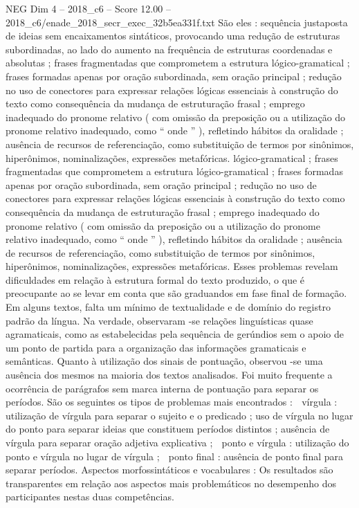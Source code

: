 \begin{textsample}{NEG Dim 4 – 2018\_c6 – Score 12.00 – 2018\_c6/enade\_2018\_secr\_exec\_32b5ea331f.txt}
São eles : sequência justaposta de ideias sem encaixamentos sintáticos, provocando uma redução de estruturas subordinadas, ao lado do aumento na frequência de estruturas coordenadas e absolutas ; frases fragmentadas que comprometem a estrutura lógico-gramatical ; frases formadas apenas por oração subordinada, sem oração principal ; redução no uso de conectores para expressar relações lógicas essenciais à construção do texto como consequência da mudança de estruturação frasal ; emprego inadequado do pronome relativo ( com omissão da preposição ou a utilização do pronome relativo inadequado, como “ onde ” ), refletindo hábitos da oralidade ; ausência de recursos de referenciação, como substituição de termos por sinônimos, hiperônimos, nominalizações, expressões metafóricas. lógico-gramatical ; frases fragmentadas que comprometem a estrutura lógico-gramatical ; frases formadas apenas por oração subordinada, sem oração principal ; redução no uso de conectores para expressar relações lógicas essenciais à construção do texto como consequência da mudança de estruturação frasal ; emprego inadequado do pronome relativo ( com omissão da preposição ou a utilização do pronome relativo inadequado, como “ onde ” ), refletindo hábitos da oralidade ; ausência de recursos de referenciação, como substituição de termos por sinônimos, hiperônimos, nominalizações, expressões metafóricas.
Esses problemas revelam dificuldades em relação à estrutura formal do texto produzido, o que é preocupante ao se levar em conta que são graduandos em fase final de formação.
Em alguns textos, falta um mínimo de textualidade e de domínio do registro padrão da língua.
Na verdade, observaram -se relações linguísticas quase agramaticais, como as estabelecidas pela sequência de gerúndios sem o apoio de um ponto de partida para a organização das informações gramaticais e semânticas.
Quanto à utilização dos sinais de pontuação, observou -se uma ausência dos mesmos na maioria dos textos analisados.
Foi muito frequente a ocorrência de parágrafos sem marca interna de pontuação para separar os períodos.
São os seguintes os tipos de problemas mais encontrados :  vírgula : utilização de vírgula para separar o sujeito e o predicado ; uso de vírgula no lugar do ponto para separar ideias que constituem períodos distintos ; ausência de vírgula para separar oração adjetiva explicativa ;  ponto e vírgula : utilização do ponto e vírgula no lugar de vírgula ;  ponto final : ausência de ponto final para separar períodos.
Aspectos morfossintáticos e vocabulares : Os resultados são transparentes em relação aos aspectos mais problemáticos no desempenho dos participantes nestas duas competências.

\end{textsample}
